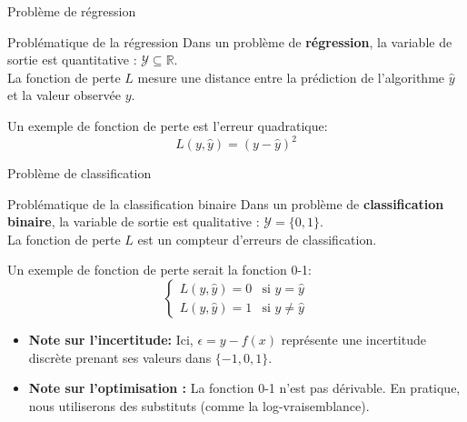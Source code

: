 \begin{frame}{Problème de régression}
	\begin{block}{Problématique de la régression}
		Dans un problème de \textbf{régression}, la variable de sortie est quantitative : $\mathcal{Y} \subseteq \mathbb{R}$. \\
		\vspace{0.3cm}
		La fonction de perte $L$ mesure une distance entre la prédiction de l'algorithme $\hat{y}$ et la valeur observée $y$. 
	\end{block}
	\pause
	Un exemple de fonction de perte est l'erreur quadratique:
	\begin{equation}
		L(y, \hat{y}) = \left( y - \hat{y}\right)^2
		\nonumber
	\end{equation}
\end{frame}

\begin{frame}{Problème de classification}
	\begin{block}{Problématique de la classification binaire}
		Dans un problème de \textbf{classification binaire}, la variable de sortie est qualitative : $\mathcal{Y} = \{0, 1\}$. \\
		\vspace{0.3cm}
		La fonction de perte $L$ est un compteur d'erreurs de classification. \\
		\vspace{0.3cm}
	\end{block}
	\pause
	Un exemple de fonction de perte serait la fonction 0-1:
	\begin{equation}
		\begin{cases}
			L(y, \hat{y}) = 0 & \text{si } y = \hat{y} \\
			L(y, \hat{y}) = 1 & \text{si } y \ne \hat{y}
		\end{cases}
		\nonumber
	\end{equation}
	\pause
	\begin{itemize}
		\item \textbf{Note sur l'incertitude:} Ici, $\epsilon = y - f(x)$ représente une incertitude discrète prenant ses valeurs dans $\{-1, 0, 1\}$.
		\item \textbf{Note sur l'optimisation :} La fonction 0-1 n'est pas dérivable. En pratique, nous utiliserons des substituts (comme la log-vraisemblance).
	\end{itemize}
	
\end{frame}